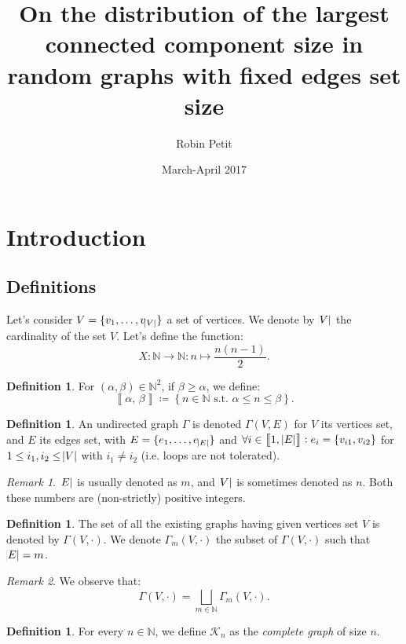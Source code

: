 \documentclass{article}
\author{Robin Petit}
\date{March-April 2017}
\title{On the distribution of the largest connected component size in random graphs with fixed edges set size}
\theoremstyle{definition}
\newtheorem{definition}[lemma]{Definition}
\theoremstyle{remark}
\newtheorem*{remark}{Remark}
\newcommand{\N}{\mathbb N}
\newcommand{\intint}[2]{\left\llbracket#1, \, #2\right\rrbracket}
\newcommand{\st}{\text{ s.t. }}
\begin{document}
\maketitle
\tableofcontents
\newpage
{}
\setcounter{page}{1}

\section{Introduction}
	\subsection{Definitions}
		Let's consider $V = \{v_1, \ldots, v_{\abs V}\}$ a set of vertices. We denote by $\abs V$ the cardinality of the set $V$. Let's define
		the function:
		\[X : \N \to \N : n \mapsto \frac {n(n-1)}2.\]

		\begin{definition} For $(\alpha, \beta) \in \N^2$, if $\beta \geq \alpha$, we define:
		\[\intint \alpha\beta \coloneqq \left\{n \in \N \st \alpha \leq n \leq \beta\right\}.\]
		\end{definition}

		\begin{definition} An undirected graph $\Gamma$ is denoted $\Gamma(V, E)$ for $V$ its vertices set, and $E$ its edges set, with $E = \{e_1, \ldots, e_{\abs E}\}$
		and $\forall i \in \intint 1{\abs E} : e_i = \{v_{i1}, v_{i2}\}$ for $1 \leq i_1, i_2 \leq \abs V$ with $i_1 \neq i_2$ (i.e. loops are not tolerated).
		\end{definition}

		\begin{remark} $\abs E$ is usually denoted as $m$, and $\abs V$ is sometimes denoted as $n$. Both these numbers are (non-strictly) positive integers.
		\end{remark}

		\begin{definition} The set of all the existing graphs having given vertices set $V$ is denoted by $\Gamma(V, \cdot)$. We denote $\Gamma_m(V, \cdot)$
		the subset of $\Gamma(V, \cdot)$ such that $\abs E = m$.
		\end{definition}

		\begin{remark} We observe that:
		\[\Gamma(V, \cdot) = \bigsqcup_{m \in \N}\Gamma_m(V, \cdot).\]
		\end{remark}

		\begin{definition} For every $n \in \N$, we define $\mathcal K_n$ as the \textit{complete graph} of size $n$.
		\end{definition}
\end{document}
